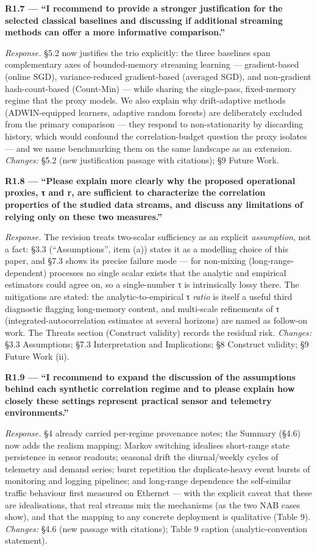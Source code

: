 \documentclass[
  11pt,
]{article}
\begin{document}
\textbf{R1.7 --- ``I recommend to provide a stronger justification for
the selected classical baselines and discussing if additional streaming
methods can offer a more informative comparison.''}

\emph{Response.} §5.2 now justifies the trio explicitly: the three
baselines span complementary axes of bounded-memory streaming learning
--- gradient-based (online SGD), variance-reduced gradient-based
(averaged SGD), and non-gradient hash-count-based (Count-Min) --- while
sharing the single-pass, fixed-memory regime that the proxy models. We
also explain why drift-adaptive methods (ADWIN-equipped learners,
adaptive random forests) are deliberately excluded from the primary
comparison --- they respond to non-stationarity by discarding history,
which would confound the correlation-budget question the proxy isolates
--- and we name benchmarking them on the same landscape as an extension.
\emph{Changes:} §5.2 (new justification passage with citations); §9
Future Work.

\textbf{R1.8 --- ``Please explain more clearly why the proposed
operational proxies, τ and r, are sufficient to characterize the
correlation properties of the studied data streams, and discuss any
limitations of relying only on these two measures.''}

\emph{Response.} The revision treats two-scalar sufficiency as an
explicit \emph{assumption}, not a fact: §3.3 (``Assumptions'', item (a))
states it as a modelling choice of this paper, and §7.3 shows its
precise failure mode --- for non-mixing (long-range-dependent) processes
no single scalar exists that the analytic and empirical estimators could
agree on, so a single-number τ is intrinsically lossy there. The
mitigations are stated: the analytic-to-empirical τ \emph{ratio} is
itself a useful third diagnostic flagging long-memory content, and
multi-scale refinements of τ (integrated-autocorrelation estimates at
several horizons) are named as follow-on work. The Threats section
(Construct validity) records the residual risk. \emph{Changes:} §3.3
Assumptions; §7.3 Interpretation and Implications; §8 Construct
validity; §9 Future Work (ii).

\textbf{R1.9 --- ``I recommend to expand the discussion of the
assumptions behind each synthetic correlation regime and to please
explain how closely these settings represent practical sensor and
telemetry environments.''}

\emph{Response.} §4 already carried per-regime provenance notes; the
Summary (§4.6) now adds the realism mapping: Markov switching idealises
short-range state persistence in sensor readouts; seasonal drift the
diurnal/weekly cycles of telemetry and demand series; burst repetition
the duplicate-heavy event bursts of monitoring and logging pipelines;
and long-range dependence the self-similar traffic behaviour first
measured on Ethernet --- with the explicit caveat that these are
idealisations, that real streams mix the mechanisms (as the two NAB
cases show), and that the mapping to any concrete deployment is
qualitative (Table 9). \emph{Changes:} §4.6 (new passage with
citations); Table 9 caption (analytic-convention statement).
\end{document}

